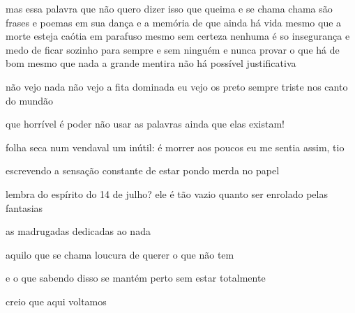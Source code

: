 \begin{poem}
\begin{stanza}
mas essa palavra que não quero dizer\verseline
isso que queima e se chama\verseline
chama\verseline
são frases e poemas\verseline
em sua dança\verseline
e a memória de que\verseline
ainda há vida\verseline
mesmo que a morte\verseline
esteja caótia \quad em parafuso\verseline
mesmo sem certeza nenhuma\verseline
é so insegurança\verseline
e medo de ficar\verseline
sozinho para sempre\verseline
e sem ninguém\verseline
e nunca provar\verseline
o que há de bom\verseline
\qquad \qquad \qquad mesmo que \qquad nada\verseline
a grande mentira\verseline
não há possível\verseline
justificativa
\end{stanza}
\begin{stanza}
não vejo nada\verseline
não vejo a fita\verseline
dominada\verseline
\qquad eu vejo os preto\verseline
\qquad sempre triste\verseline
\qquad nos canto do mundão
\end{stanza}
\begin{stanza}
que horrível é poder não usar as palavras\verseline
ainda que elas existam!
\end{stanza}
\begin{stanza}
folha seca num\verseline
vendaval\verseline
um inútil:\verseline
é morrer aos poucos\verseline
eu me sentia assim,\verseline
tio
\end{stanza}
\begin{stanza}
escrevendo\verseline
a sensação constante\verseline
de estar pondo merda\verseline
no papel
\end{stanza}
\begin{stanza}
lembra do espírito\verseline
do 14 de julho?\verseline
ele é tão vazio\verseline
quanto ser enrolado\verseline
pelas fantasias
\end{stanza}
\begin{stanza}
as madrugadas\verseline
dedicadas\verseline
ao nada
\end{stanza}
\begin{stanza}
aquilo que se chama\verseline
loucura\verseline
de querer o que não tem
\end{stanza}
\begin{stanza}
e o que\verseline
sabendo disso\verseline
se mantém perto\verseline
sem estar totalmente
\end{stanza}
\begin{stanza}
creio que aqui voltamos\verseline

\end{stanza}
\end{poem}

